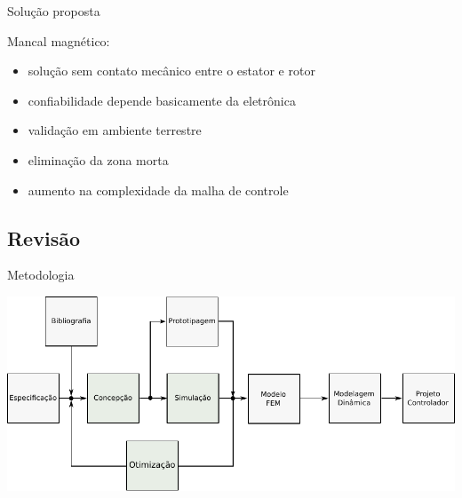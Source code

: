 \documentclass{beamer}
\begin{document}
\begin{frame}{Solução proposta}

	Mancal magnético:

	\begin{itemize}
		\item solução sem contato mecânico entre o estator e rotor
		\item confiabilidade depende basicamente da eletrônica
		\item validação em ambiente terrestre 
		\item eliminação da zona morta
		\item aumento na complexidade da malha de controle
	\end{itemize}
\end{frame}

%


\subsection{Revisão}



\begin{frame}{Metodologia}
	\begin{center}
	\includegraphics[width=1\linewidth]{../../Dissertacao/Figs/metodologia_fluxo_dev}
	\end{center}
\end{frame}
%
\end{document}
